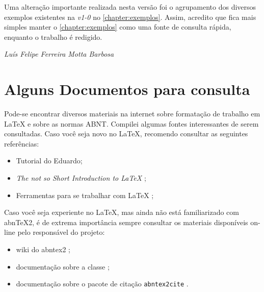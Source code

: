 \documentclass[
  12pt,		%
  a4paper,	%
  openright,%
  oneside,	%
  chapter=TITLE,		%
  section=TITLE,		%
  english,	%
  french,	%
  spanish,	%
  brazil
]{abntex2}
\begin{document}
    Uma alteração importante realizada nesta versão foi o agrupamento dos diversos exemplos existentes na \emph{v1-0} no \autoref{chapter:exemplos}.  Assim, acredito que fica mais simples manter o  \autoref{chapter:exemplos} como uma fonte de consulta rápida, enquanto o trabalho é redigido.
    
    
    
    \begin{flushright}
    \textit{Luís Felipe Ferreira Motta Barbosa}
    \end{flushright}
    
    
    
    
    \section{Alguns Documentos para consulta}
    
    Pode-se encontrar diversos materiais na internet sobre formatação de trabalho em \LaTeX{} e sobre as normas ABNT. Compilei algumas fontes interessantes de serem consultadas.    Caso você seja novo no \LaTeX{}, recomendo consultar as seguintes referências:
    
    \begin{itemize}
        \item Tutorial do Eduardo;
        \item \textit{The not so Short Introduction to LaTeX} \cite{lshort};
        \item Ferramentas para se trabalhar com \LaTeX{} \cite{abntex2-wiki-ferramentas};%

    \end{itemize}
    
    Caso você seja experiente no \LaTeX{}, mas ainda não está familiarizado com abn\TeX{}2, é de extrema importância sempre consultar os materiais disponíveis on-line pelo responsável do projeto:
    \begin{itemize}
        \item wiki do abntex2 \cite{abntex2-wiki};
        \item documentação sobre a classe ;
        \item documentação sobre o pacote de citação \verb|abntex2cite| .
    \end{itemize}
    
\end{document}
